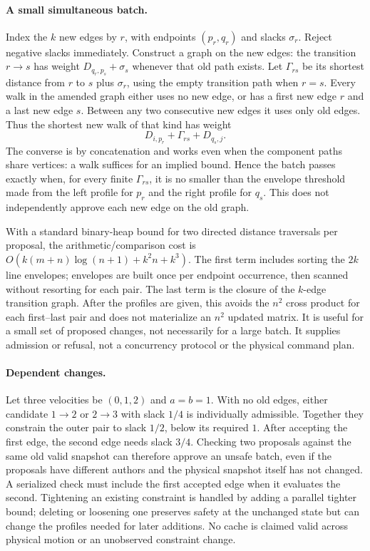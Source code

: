 \documentclass[11pt]{article}
\begin{document}
\paragraph{A small simultaneous batch.}
Index the $k$ new edges by $r$, with endpoints $(p_r,q_r)$ and slacks $\sigma_r$. Reject negative slacks immediately. Construct a graph on the new edges: the transition $r\to s$ has weight $D_{q_r,p_s}+\sigma_s$ whenever that old path exists. Let $\Gamma_{rs}$ be its shortest distance from $r$ to $s$ plus $\sigma_r$, using the empty transition path when $r=s$. Every walk in the amended graph either uses no new edge, or has a first new edge $r$ and a last new edge $s$. Between any two consecutive new edges it uses only old edges. Thus the shortest new walk of that kind has weight
\[
 D_{i,p_r}+\Gamma_{rs}+D_{q_s,j}.
\]
The converse is by concatenation and works even when the component paths share vertices: a walk suffices for an implied bound. Hence the batch passes exactly when, for every finite $\Gamma_{rs}$, it is no smaller than the envelope threshold made from the left profile for $p_r$ and the right profile for $q_s$. This does not independently approve each new edge on the old graph.

With a standard binary-heap bound for two directed distance traversals per proposal, the arithmetic/comparison cost is $O(k(m+n)\log(n+1)+k^2n+k^3)$. The first term includes sorting the $2k$ line envelopes; envelopes are built once per endpoint occurrence, then scanned without resorting for each pair. The last term is the closure of the $k$-edge transition graph. After the profiles are given, this avoids the $n^2$ cross product for each first--last pair and does not materialize an $n^2$ updated matrix. It is useful for a small set of proposed changes, not necessarily for a large batch. It supplies admission or refusal, not a concurrency protocol or the physical command plan.

\paragraph{Dependent changes.}
Let three velocities be $(0,1,2)$ and $a=b=1$. With no old edges, either candidate $1\to2$ or $2\to3$ with slack $1/4$ is individually admissible. Together they constrain the outer pair to slack $1/2$, below its required $1$. After accepting the first edge, the second edge needs slack $3/4$. Checking two proposals against the same old valid snapshot can therefore approve an unsafe batch, even if the proposals have different authors and the physical snapshot itself has not changed. A serialized check must include the first accepted edge when it evaluates the second. Tightening an existing constraint is handled by adding a parallel tighter bound; deleting or loosening one preserves safety at the unchanged state but can change the profiles needed for later additions. No cache is claimed valid across physical motion or an unobserved constraint change.
\end{document}
